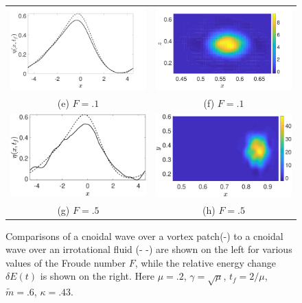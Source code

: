 \documentclass[a4paper,11pt]{article}
\begin{document}
\begin{figure}
\begin{tabular}{cc}
\includegraphics[width=.35\textwidth]{profiles_wm_10_modu_pt6} & \includegraphics[width=.35\textwidth]{vorticity_wm_10_modu_pt6}\\
(e)  $F=.1$ & (f)  $F=.1$\\
\includegraphics[width=.35\textwidth]{profiles_wm_50_modu_pt6} & \includegraphics[width=.35\textwidth]{vorticity_wm_50_modu_pt6}\\
(g)  $F=.5$ & (h)  $F=.5$
\end{tabular}
\caption{Comparisons of a cnoidal wave over a vortex patch(-) to a cnoidal wave over an irrotational fluid (- -) are shown on the left for various values of the Froude number $F$, while the relative energy change $\delta E(t)$ is shown on the right.  Here $\mu=.2$, $\gamma=\sqrt{\mu}$, $t_{f}=2/\mu$, $\tilde{m}=.6$, $\kappa = .43$.}
\label{fig:midsolwave}
\end{figure}
\end{document}

